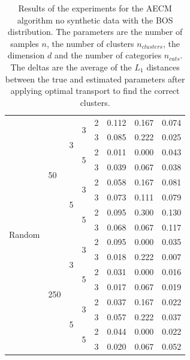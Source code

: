 \begin{table}[H]
\begin{minipage}{.48\columnwidth}
\begin{adjustbox}{width=\columnwidth}
\begin{tabular}{lllllrrr}
\multirow[t]{16}{*}{Random} & \multirow[t]{8}{*}{50} & \multirow[t]{4}{*}{3} & \multirow[t]{2}{*}{3} & 2 & 0.112 & 0.167 & 0.074 \\
 &  &  &  & 3 & 0.085 & 0.222 & 0.025 \\
\cline{4-8}
 &  &  & \multirow[t]{2}{*}{5} & 2 & 0.011 & 0.000 & 0.043 \\
 &  &  &  & 3 & 0.039 & 0.067 & 0.038 \\
\cline{3-8} \cline{4-8}
 &  & \multirow[t]{4}{*}{5} & \multirow[t]{2}{*}{3} & 2 & 0.058 & 0.167 & 0.081 \\
 &  &  &  & 3 & 0.073 & 0.111 & 0.079 \\
\cline{4-8}
 &  &  & \multirow[t]{2}{*}{5} & 2 & 0.095 & 0.300 & 0.130 \\
 &  &  &  & 3 & 0.068 & 0.067 & 0.117 \\
\cline{2-8} \cline{3-8} \cline{4-8}
 & \multirow[t]{8}{*}{250} & \multirow[t]{4}{*}{3} & \multirow[t]{2}{*}{3} & 2 & 0.095 & 0.000 & 0.035 \\
 &  &  &  & 3 & 0.018 & 0.222 & 0.007 \\
\cline{4-8}
 &  &  & \multirow[t]{2}{*}{5} & 2 & 0.031 & 0.000 & 0.016 \\
 &  &  &  & 3 & 0.017 & 0.067 & 0.019 \\
\cline{3-8} \cline{4-8}
 &  & \multirow[t]{4}{*}{5} & \multirow[t]{2}{*}{3} & 2 & 0.037 & 0.167 & 0.022 \\
 &  &  &  & 3 & 0.057 & 0.222 & 0.037 \\
\cline{4-8}
 &  &  & \multirow[t]{2}{*}{5} & 2 & 0.044 & 0.000 & 0.022 \\
 &  &  &  & 3 & 0.020 & 0.067 & 0.052 \\
\cline{1-8} \cline{2-8} \cline{3-8} \cline{4-8}
\bottomrule
\end{tabular}
\end{adjustbox}
\caption{Results of the experiments for the AECM algorithm no synthetic data with the BOS distribution. The parameters are the number of samples $n$, the number of clusters $n_{clusters}$, the dimension $d$ and the number of categories $n_{cats}$. The deltas are the average of the $L_1$ distances between the true and estimated parameters after applying optimal transport to find the correct clusters.}
\label{tab:results_bos}
\end{minipage} \hspace{.02\columnwidth}%
\begin{minipage}{.48\columnwidth}
\centering
\begin{adjustbox}{width=\columnwidth}

\end{adjustbox}
\end{minipage}
\end{table}
